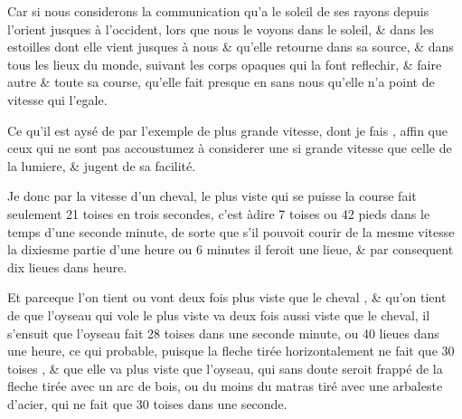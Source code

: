 \documentclass[11pt,a4paper]{article}
\begin{document}
Car si nous considerons la communication qu'a le soleil de ses rayons depuis l'orient jusques à l'occident, lors que nous le voyons dans le soleil, \& dans les estoilles dont elle vient jusques à nous \& qu'elle retourne dans sa source, \& dans tous les lieux du monde, suivant les corps opaques qui la font reflechir, \&  faire  autre  \& toute sa course, qu'elle fait presque en  sans nous  qu'elle n'a point de vitesse  qui l'egale.

Ce qu'il est aysé de  par l'exemple de \struck{\ill{}} plus grande vitesse, dont je fais   , affin que ceux qui ne sont pas accoustumez à considerer une si grande vitesse que celle de la lumiere, \& jugent de sa facilité.

Je  donc par la vitesse d'un cheval, \struck{\ill{}}  le plus viste qui se puisse    la course fait seulement 21 toises en trois secondes, c'est àdire 7 toises ou 42 pieds dans le temps d'une seconde minute, de sorte que s'il pouvoit courir de la mesme vitesse la dixiesme partie d'une heure ou 6 minutes il feroit une lieue, \& par consequent dix lieues dans  heure.

Et parceque l'on tient \struck{\ill{}}   ou \struck{\ill{}} \add{\ill{}}  vont deux fois plus viste que le cheval \struck{\ill{}} \struck{\ill{}}, \& qu'on tient de  que l'oyseau qui vole le plus viste va deux fois aussi viste que le cheval, il s'ensuit que l'oyseau fait 28 toises dans une seconde minute, ou 40 lieues dans une heure, ce qui   probable, puisque la fleche tirée horizontalement ne fait que 30 toises , \& que  elle va plus viste que l'oyseau, qui sans doute seroit frappé de la fleche tirée avec un arc de bois, ou du moins du matras tiré avec une arbaleste d'acier, qui ne fait que 30 toises dans une seconde.
\end{document}
